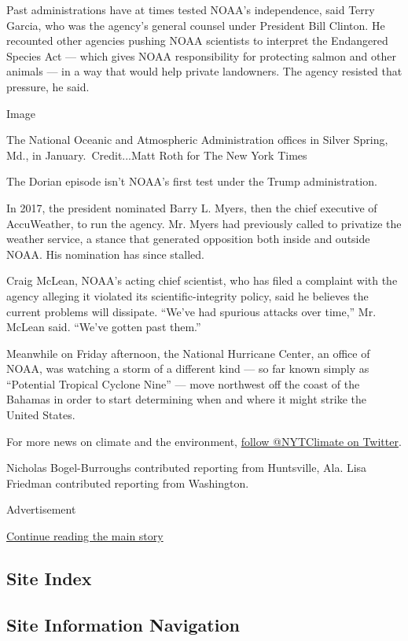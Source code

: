 Past administrations have at times tested NOAA's independence, said
Terry Garcia, who was the agency's general counsel under President Bill
Clinton. He recounted other agencies pushing NOAA scientists to
interpret the Endangered Species Act --- which gives NOAA responsibility
for protecting salmon and other animals --- in a way that would help
private landowners. The agency resisted that pressure, he said.

Image

The National Oceanic and Atmospheric Administration offices in Silver
Spring, Md., in January.~Credit...Matt Roth for The New York Times

The Dorian episode isn't NOAA's first test under the Trump
administration.

In 2017, the president nominated Barry L. Myers, then the chief
executive of AccuWeather, to run the agency. Mr. Myers had previously
called to privatize the weather service, a stance that generated
opposition both inside and outside NOAA. His nomination has since
stalled.

Craig McLean, NOAA's acting chief scientist, who has filed a complaint
with the agency alleging it violated its scientific-integrity policy,
said he believes the current problems will dissipate. ``We've had
spurious attacks over time,'' Mr. McLean said. ``We've gotten past
them.''

Meanwhile on Friday afternoon, the National Hurricane Center, an office
of NOAA, was watching a storm of a different kind --- so far known
simply as ``Potential Tropical Cyclone Nine'' --- move northwest off the
coast of the Bahamas in order to start determining when and where it
might strike the United States.

For more news on climate and the environment,
\href{https://twitter.com/nytclimate}{follow @NYTClimate on Twitter}.

Nicholas Bogel-Burroughs contributed reporting from Huntsville, Ala.
Lisa Friedman contributed reporting from Washington.

Advertisement

\protect\hyperlink{after-bottom}{Continue reading the main story}

\hypertarget{site-index}{%
\subsection{Site Index}\label{site-index}}

\hypertarget{site-information-navigation}{%
\subsection{Site Information
Navigation}\label{site-information-navigation}}

